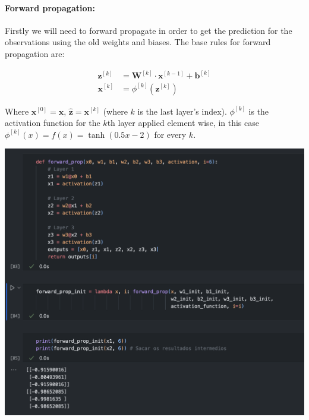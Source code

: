 \documentclass[12pt]{article}
\begin{document}
\begin{enumerate}[leftmargin=\labelsep]
    \paragraph{Forward propagation:} Firstly we will need to forward propagate in order to get the prediction for the observations using the old weights and biases.
    The base rules for forward propagation are:

    \begin{equation}
    \begin{split}
        \mathbf{z}^{[k]} &= \mathbf{W}^{[k]} \cdot \mathbf{x}^{[k-1]} + \mathbf{b}^{[k]} \\
        \mathbf{x}^{[k]} &= \phi^{[k]}(\mathbf{z}^{[k]})
    \end{split}
    \end{equation}

    Where $\mathbf{x}^{[0]} = \mathbf{x}$, $\hat{\mathbf{z}} = \mathbf{x}^{[k]}$ (where $k$ is the last layer's index). $\phi^{[k]}$ is the activation function for the $k$th layer applied element wise, in this case $\phi^{[k]}(x) = f(x) =\tanh(0.5x-2)$ for every $k$.

    \begin{center}
        \includegraphics[scale=0.4]{images/code3.png}
    \end{center}


\end{enumerate}
\end{document}
